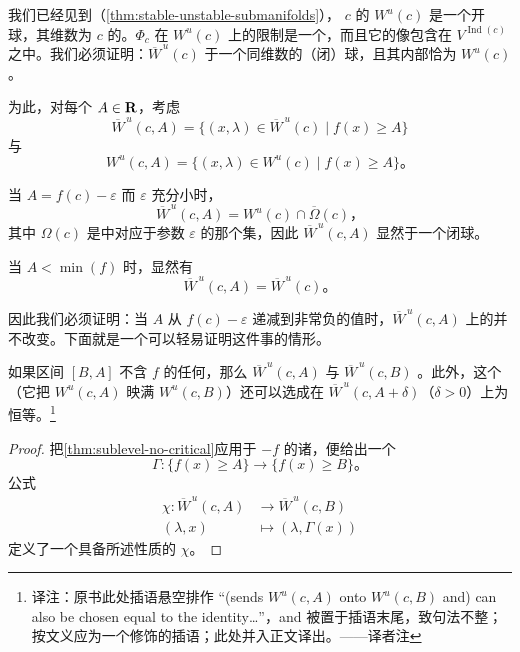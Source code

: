 \textbf{\trCellularDecomposition}

我们已经见到（\cref{thm:stable-unstable-submanifolds}），\trCriticalPoint{} $c$ 的\trUnstableManifold{} $W^u(c)$ 是一个开球，其维数为 $c$ 的\trIndex。$\varPhi_c$ 在 $W^u(c)$ 上的限制是一个\trHomeomorphism，而且它的像包含在 $V^{\operatorname{Ind}(c)}$ 之中。我们必须证明：$\overline{W}^{\,u}(c)$ \trHomeomorphic{}于一个同维数的（闭）球，且其内部恰为 $W^u(c)$。

为此，对每个 $A\in\mathbf{R}$，考虑
\[
\overline{W}^{\,u}(c,A)=\bigl\{(x,\lambda)\in\overline{W}^{\,u}(c)\mid f(x)\ge A\bigr\}
\]
与
\[
W^u(c,A)=\bigl\{(x,\lambda)\in W^u(c)\mid f(x)\ge A\bigr\}\text{。}
\]

当 $A=f(c)-\varepsilon$ 而 $\varepsilon$ 充分小时，
\[
\overline{W}^{\,u}(c,A)=W^u(c)\cap\overline{\Omega}(c)\text{，}
\]
其中 $\Omega(c)$ 是\trMorseChart{}中对应于参数 $\varepsilon$ 的那个\trOpen{}集，因此 $\overline{W}^{\,u}(c,A)$ 显然\trHomeomorphic{}于一个闭球。

当 $A<\min(f)$ 时，显然有
\[
\overline{W}^{\,u}(c,A)=\overline{W}^{\,u}(c)\text{。}
\]

因此我们必须证明：当 $A$ 从 $f(c)-\varepsilon$ 递减到非常负的值时，$\overline{W}^{\,u}(c,A)$ 上的\trTopology{}并不改变。下面就是一个可以轻易证明这件事的情形。

\begin{proposition}\label{thm:no-critical-interval-homeomorphism}
如果区间 $[B,A]$ 不含 $f$ 的任何\trCriticalValue，那么 $\overline{W}^{\,u}(c,A)$ 与 $\overline{W}^{\,u}(c,B)$ \trHomeomorphic。此外，这个\trHomeomorphism{}（它把 $W^u(c,A)$ 映满 $W^u(c,B)$）还可以选成在 $\overline{W}^{\,u}(c,A+\delta)$（$\delta>0$）上为恒等。\footnote{译注：原书此处插语悬空排作 “(sends $W^u(c,A)$ onto $W^u(c,B)$ and) can also be chosen equal to the identity…”，and 被置于插语末尾，致句法不整；按文义应为一个修饰\trHomeomorphic{}的插语；此处并入正文译出。——译者注}
\end{proposition}

\begin{proof}
把\cref{thm:sublevel-no-critical}应用于 $-f$ 的诸\trSublevelSet，便给出一个\trDiffeomorphism
\[
\varGamma:\{f(x)\ge A\}\longrightarrow\{f(x)\ge B\}\text{。}
\]
公式
\[
\begin{aligned}
\chi\colon\overline{W}^{\,u}(c,A)&\longrightarrow\overline{W}^{\,u}(c,B)\\
(\lambda,x)&\longmapsto(\lambda,\varGamma(x))
\end{aligned}
\]
定义了一个具备所述性质的\trHomeomorphism{} $\chi$。
\end{proof}

